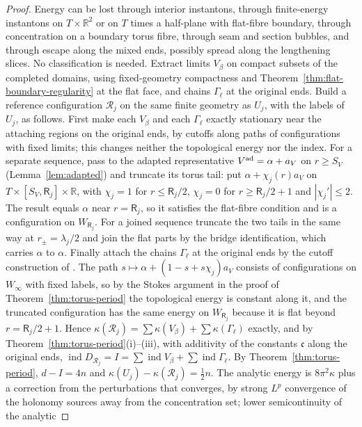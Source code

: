 \documentclass[11pt]{amsart}
\theoremstyle{definition}
\theoremstyle{remark}
\theoremstyle{plain}
\numberwithin{equation}{section}
\newcommand{\RR}{\mathbb{R}}
\newcommand{\ind}{\operatorname{ind}}
\begin{document}
\begin{proof}
Energy can be lost through interior instantons, through finite-energy
instantons on $T\times\RR^2$ or on $T$ times a half-plane with flat-fibre boundary,
through concentration on a boundary torus fibre, through seam and section
bubbles, and through escape along the mixed ends, possibly spread along the
lengthening slices. No classification is needed. Extract limits $V_\beta$ on
compact subsets of the completed domains, using fixed-geometry compactness and
Theorem~\ref{thm:flat-boundary-regularity} at the flat face, and chains $\Gamma_\ell$
at the original ends. Build a reference configuration $\mathcal R_j$ on the same finite geometry as $U_j$,
with the labels of $U_j$, as follows. First make each $V_\beta$ and each $\Gamma_\ell$
exactly stationary near the attaching regions on the original ends, by cutoffs
along paths of configurations with fixed limits; this changes neither the
topological energy nor the index. For a separate sequence, pass to the adapted
representative $V^{\rm ad}=\alpha+a_V$ on $r\ge S_V$ (Lemma~\ref{lem:adapted}) and
truncate its torus tail: put $\alpha+\chi_j(r)a_V$ on $T\times[S_V,\mathsf R_j]\times\RR$, with
$\chi_j=1$ for $r\le \mathsf R_j/2$, $\chi_j=0$ for $r\ge \mathsf R_j/2+1$ and $|\chi_j'|\le2$. The result
equals $\alpha$ near $r=\mathsf R_j$, so it satisfies the flat-fibre condition and is a configuration on $W_{\mathsf R_j}$. For a joined sequence truncate the two tails in the same
way at $r_\pm=\lambda_j/2$ and join the flat parts by the bridge identification, which
carries $\alpha$ to $\alpha$. Finally attach the chains $\Gamma_\ell$ at the original ends by
the cutoff construction of \cite[Propositions~4.65 and~4.69]{DFL}. The path
$s\mapsto\alpha+(1-s+s\chi_j)a_V$ consists of configurations on $W_\infty$ with
fixed labels, so by the Stokes argument in the proof of
Theorem~\ref{thm:torus-period} the topological energy is constant along it, and
the truncated configuration has the same energy on $W_{\mathsf R_j}$ because it is flat
beyond $r=\mathsf R_j/2+1$. Hence $\kappa(\mathcal R_j)=\sum\kappa(V_\beta)+\sum\kappa(\Gamma_\ell)$
exactly, and by Theorem~\ref{thm:torus-period}(i)--(iii), with additivity of the
constants $\mathfrak c$ along the original ends, $\ind D_{\mathcal R_j}=I=\sum\ind V_\beta+\sum\ind \Gamma_\ell$. By
Theorem~\ref{thm:torus-period}, $d-I=4n$ and $\kappa(U_j)-\kappa(\mathcal R_j)=
\tfrac12n$. The analytic energy is $8\pi^2\kappa$ plus a correction from the
perturbations that converges, by strong $L^p$ convergence of the holonomy
sources away from the concentration set; lower semicontinuity of the analytic

\end{proof}
\end{document}
